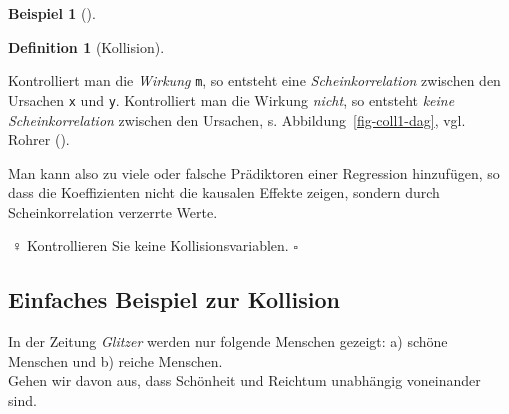 \documentclass[
  ngerman,
  letterpaper,
  twoside,
  open=any]{scrbook}
\theoremstyle{definition}
\newtheorem{example}{Beispiel}[chapter]
\theoremstyle{plain}
\theoremstyle{definition}
\theoremstyle{definition}
\newtheorem{definition}{Definition}[chapter]
\theoremstyle{remark}
\begin{document}
\begin{example}[]
\begin{definition}[Kollision]
\end{definition}

Kontrolliert man die \emph{Wirkung} \texttt{m}, so entsteht eine
\emph{Scheinkorrelation} zwischen den Ursachen \texttt{x} und
\texttt{y}. Kontrolliert man die Wirkung \emph{nicht}, so entsteht
\emph{keine Scheinkorrelation} zwischen den Ursachen, s.
Abbildung~\ref{fig-coll1-dag}, vgl. Rohrer
().

\begin{tcolorbox}[enhanced jigsaw, arc=.35mm, bottomrule=.15mm, bottomtitle=1mm, breakable, colback=white, colbacktitle=quarto-callout-important-color!10!white, colframe=quarto-callout-important-color-frame, coltitle=black, left=2mm, leftrule=.75mm, opacityback=0, opacitybacktitle=0.6, rightrule=.15mm, title=\textcolor{quarto-callout-important-color}{\faExclamation}\hspace{0.5em}{Wichtig}, titlerule=0mm, toprule=.15mm, toptitle=1mm]

Man kann also zu viele oder falsche Prädiktoren einer Regression
hinzufügen, so dass die Koeffizienten nicht die kausalen Effekte zeigen,
sondern durch Scheinkorrelation verzerrte Werte.

\end{tcolorbox}

\begin{tcolorbox}[enhanced jigsaw, arc=.35mm, bottomrule=.15mm, bottomtitle=1mm, breakable, colback=white, colbacktitle=quarto-callout-tip-color!10!white, colframe=quarto-callout-tip-color-frame, coltitle=black, left=2mm, leftrule=.75mm, opacityback=0, opacitybacktitle=0.6, rightrule=.15mm, title=\textcolor{quarto-callout-tip-color}{\faLightbulb}\hspace{0.5em}{Tipp}, titlerule=0mm, toprule=.15mm, toptitle=1mm]

🙅♀️ Kontrollieren Sie keine Kollisionsvariablen. \(\square\)

\end{tcolorbox}

\subsection{Einfaches Beispiel zur
Kollision}\label{einfaches-beispiel-zur-kollision}

In der Zeitung \emph{Glitzer} werden nur folgende Menschen gezeigt: a)
schöne Menschen und b) reiche Menschen.\\
Gehen wir davon aus, dass Schönheit und Reichtum unabhängig voneinander
sind.


\end{example}
\end{document}
